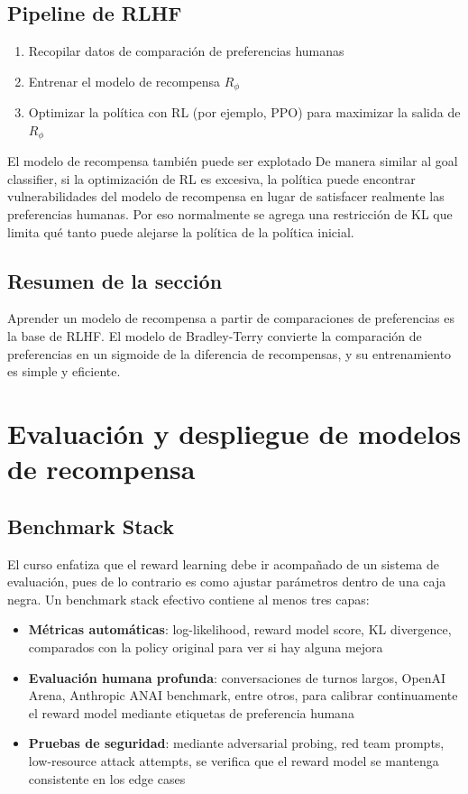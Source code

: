 \documentclass[a4paper]{article}
\begin{document}
\subsection{Pipeline de RLHF}

\begin{enumerate}
    \item Recopilar datos de comparación de preferencias humanas
    \item Entrenar el modelo de recompensa $R_\phi$
    \item Optimizar la política con RL (por ejemplo, PPO) para maximizar la salida de $R_\phi$
\end{enumerate}

\begin{warningbox}{El modelo de recompensa también puede ser explotado}
De manera similar al goal classifier, si la optimización de RL es excesiva, la política puede encontrar vulnerabilidades del modelo de recompensa en lugar de satisfacer realmente las preferencias humanas. Por eso normalmente se agrega una restricción de KL que limita qué tanto puede alejarse la política de la política inicial.
\end{warningbox}

\subsection{Resumen de la sección}

Aprender un modelo de recompensa a partir de comparaciones de preferencias es la base de RLHF. El modelo de Bradley-Terry convierte la comparación de preferencias en un sigmoide de la diferencia de recompensas, y su entrenamiento es simple y eficiente.

\section{Evaluación y despliegue de modelos de recompensa}

\subsection{Benchmark Stack}

El curso enfatiza que el reward learning debe ir acompañado de un sistema de evaluación, pues de lo contrario es como ajustar parámetros dentro de una caja negra. Un benchmark stack efectivo contiene al menos tres capas:

\begin{itemize}
    \item \textbf{Métricas automáticas}: log-likelihood, reward model score, KL divergence, comparados con la policy original para ver si hay alguna mejora
    \item \textbf{Evaluación humana profunda}: conversaciones de turnos largos, OpenAI Arena, Anthropic ANAI benchmark, entre otros, para calibrar continuamente el reward model mediante etiquetas de preferencia humana
    \item \textbf{Pruebas de seguridad}: mediante adversarial probing, red team prompts, low-resource attack attempts, se verifica que el reward model se mantenga consistente en los edge cases
\end{itemize}
\end{document}
